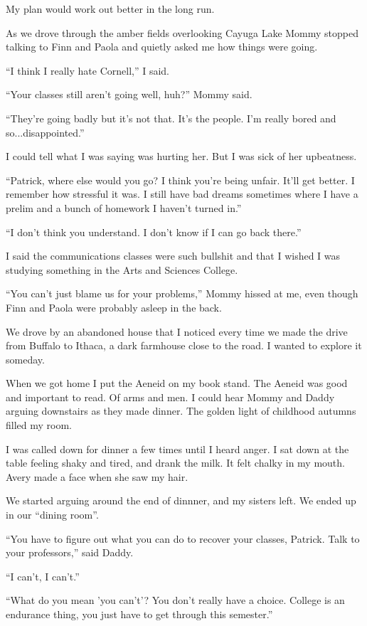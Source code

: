 My plan would work out better in the long run.

As we drove through the amber fields overlooking Cayuga Lake Mommy stopped
talking to Finn and Paola and quietly asked me how things were going.

``I think I really hate Cornell,'' I said.

``Your classes still aren't going well, huh?'' Mommy said. 

``They're going badly but it's not that.  It's the people.  I'm really bored and
so...disappointed.''

I could tell what I was saying was hurting her.  But I was sick of her
upbeatness.

``Patrick, where else would you go?  I think you're being unfair.  It'll get
better.  I remember how stressful it was.  I still have bad dreams sometimes
where I have a prelim and a bunch of homework I haven't turned in.''

``I don't think you understand.  I don't know if I can go back there.''

I said the communications classes were such bullshit and that I wished I was
studying something in the Arts and Sciences College.  

``You can't just blame us for your problems,'' Mommy hissed at me, even though Finn
and Paola were probably asleep in the back.

We drove by an abandoned house that I noticed every time we made the drive from
Buffalo to Ithaca, a dark farmhouse close to the road.  I wanted to
explore it someday.

When we got home I put the Aeneid on my book stand.  The Aeneid was good and
important to read.  Of arms and men.  I could hear Mommy and Daddy arguing
downstairs as they made dinner.   The golden light of childhood autumns filled
my room.

I was called down for dinner a few times until I heard anger.  I sat down at the
table feeling shaky and tired, and drank the milk.  It felt chalky in my mouth.
Avery made a face when she saw my hair.

We started arguing around the end of dinnner, and my sisters left.  We ended up
in our ``dining room''.

``You have to figure out what you can do to recover your classes, Patrick.  Talk
to your professors,'' said Daddy.

``I can't, I can't.'' 

``What do you mean 'you can't'?  You don't really have a choice.  College is an
endurance thing, you just have to get through this semester.''

